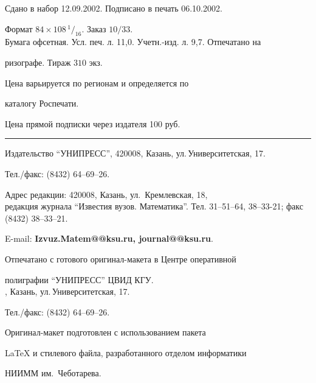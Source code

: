 \setlength{\hoffset}{-23mm}


\bigskip


\noindent Сдано в набор 12.09.2002. Подписано в печать 06.10.2002.


Формат $84\times 108 \,^1/_{16}.$ Заказ $10/33$.\\


Бумага офсетная. Усл. печ. л. 11,0. Учетн.-изд. л. 9,7. Отпечатано на 


ризографе. Тираж $310$ экз. 





\noindent Цена варьируется по регионам и определяется по 


каталогу Роспечати. 





\noindent Цена прямой подписки через издателя 100 руб. 


\bigskip


\hrule


\bigskip


\noindent Издательство ``УНИПРЕСС'', 420008, Казань, ул.\,Университетская, 17.


Тел./факс: (8432) 64--69--26.\\


\smallskip





\noindent Адрес редакции: 420008, Казань, ул.~Кремлевская, 18,\\  


редакция журнала  ``Известия вузов. Математика''. Тел. 31--51--64, 38--33-21; факс (8432) 38--33--21.





\noindent E-mail: {\bf Izvuz.Matem@@ksu.ru, journal@@ksu.ru}. \par


\bigskip 


\noindent Отпечатано с готового оригинал-макета в Центре оперативной


полиграфии ``УНИПРЕСС'' ЦВИД КГУ. \\





, Казань, ул.\,Университетская, 17.


Тел./факс: (8432) 64--69--26. \par


\bigskip


\noindent Оригинал-макет подготовлен с использованием пакета


\AmS\LaTeX{} и стилевого файла, разработанного отделом информатики


НИИММ им.~Чеботарева.








